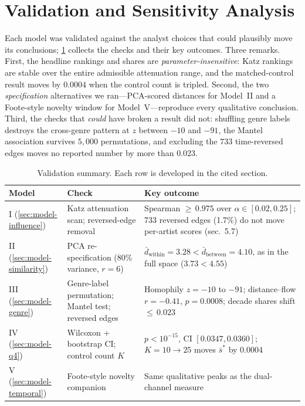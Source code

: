 \documentclass[11pt,letterpaper]{article}
\numberwithin{equation}{section}
\begin{document}






\section{Validation and Sensitivity Analysis}\label{sec:validation}

Each model was validated against the analyst choices that could plausibly
move its conclusions; \cref{tab:validation} collects the checks and their
key outcomes. Three remarks. First, the headline rankings and shares are
\emph{parameter-insensitive}: Katz rankings are stable over the entire
admissible attenuation range, and the matched-control result moves by
$0.0004$ when the control count is tripled. Second, the two
\emph{specification} alternatives we ran---PCA-scored distances for
Model~II and a Foote-style novelty window for Model~V---reproduce every
qualitative conclusion. Third, the checks that \emph{could} have broken a
result did not: shuffling genre labels destroys the cross-genre pattern
at $z$ between $-10$ and $-91$, the Mantel association survives
$5{,}000$ permutations, and excluding the $733$ time-reversed edges moves
no reported number by more than $0.023$.

\begin{table}[htbp]
\centering\small
\caption{Validation summary. Each row is developed in the cited section.}
\label{tab:validation}
\begin{tabular}{@{}p{}p{}p{}@{}}
\toprule
Model & Check & Key outcome \\
\midrule
I (\cref{sec:model-influence})
  & Katz attenuation scan; reversed-edge removal
  & Spearman ${\ge}\,0.975$ over $\alpha\in[0.02,0.25]$; 733 reversed
    edges (1.7\%) do not move per-artist scores (sec.~5.7) \\
\addlinespace
II (\cref{sec:model-similarity})
  & PCA re-specification (80\% variance, $r=6$)
  & $\bar d_{\mathrm{within}}=3.28<\bar d_{\mathrm{between}}=4.10$, as in
    the full space ($3.73<4.55$) \\
\addlinespace
III (\cref{sec:model-genre})
  & Genre-label permutation; Mantel test; reversed edges
  & Homophily $z=-10$ to $-91$; distance--flow $r=-0.41$, $p=0.0008$;
    decade shares shift ${\le}\,0.023$ \\
\addlinespace
IV (\cref{sec:model-q4})
  & Wilcoxon + bootstrap CI; control count $K$
  & $p<10^{-15}$, CI $[0.0347,0.0360]$; $K=10\to25$ moves $\bar s^{*}$ by
    $0.0004$ \\
\addlinespace
V (\cref{sec:model-temporal})
  & Foote-style novelty companion
  & Same qualitative peaks as the dual-channel measure \\
\bottomrule
\end{tabular}
\end{table}
\end{document}
